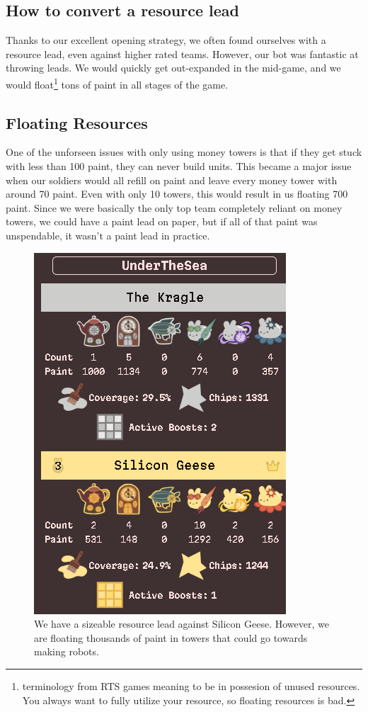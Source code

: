\subsection{How to convert a resource lead}

Thanks to our excellent opening strategy, we often found ourselves with a resource lead, even against higher rated teams. However, our bot was fantastic at throwing leads. We would quickly get out-expanded in the mid-game, and we would float\footnote{terminology from RTS games meaning to be in possesion of unused resources. You always want to fully utilize your resource, so floating resources is bad.} tons of paint in all stages of the game.

\subsection{Floating Resources}

One of the unforseen issues with only using money towers is that if they get stuck with less than 100 paint, they can never build units. This became a major issue when our soldiers would all refill on paint and leave every money tower with around 70 paint. Even with only 10 towers, this would result in us floating 700 paint. Since we were basically the only top team completely reliant on money towers, we could have a paint lead on paper, but if all of that paint was unspendable, it wasn't a paint lead in practice.

\begin{figure}[h]
    \centering
    \includegraphics[scale=0.5]{images/floating_resources.png}
    \caption{We have a sizeable resource lead against Silicon Geese. However, we are floating thousands of paint in towers that could go towards making robots.}
\end{figure}

